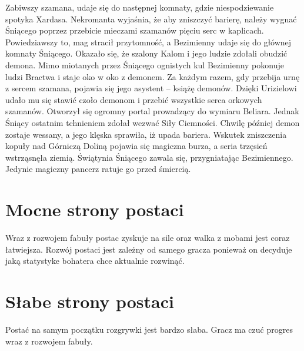\documentclass[11pt,polish, openany]{book}
\begin{document}
Zabiwszy szamana, udaje się do następnej komnaty, gdzie niespodziewanie spotyka Xardasa. Nekromanta wyjaśnia, że aby zniszczyć barierę, należy wygnać Śniącego poprzez przebicie mieczami szamanów pięciu serc w kaplicach. Powiedziawszy to, mag stracił przytomność, a Bezimienny udaje się do głównej komnaty Śniącego. Okazało się, że szalony Kalom i jego ludzie zdołali obudzić demona. Mimo miotanych przez Śniącego ognistych kul Bezimienny pokonuje ludzi Bractwa i staje oko w oko z demonem. Za każdym razem, gdy przebija urnę z sercem szamana, pojawia się jego asystent – książę demonów. Dzięki Urizielowi udało mu się stawić czoło demonom i przebić wszystkie serca orkowych szamanów. Otworzył się ogromny portal prowadzący do wymiaru Beliara. Jednak Śniący ostatnim tchnieniem zdołał wezwać Siły Ciemności. Chwilę później demon zostaje wessany, a jego klęska sprawiła, iż upada bariera. Wskutek zniszczenia kopuły nad Górniczą Doliną pojawia się magiczna burza, a seria trzęsień wstrząsnęła ziemią. Świątynia Śniącego zawala się, przygniatając Bezimiennego. Jedynie magiczny pancerz ratuje go przed śmiercią.
\newline
\section{Mocne strony postaci}
 Wraz z rozwojem fabuły postac zyskuje na sile oraz walka z mobami jest coraz łatwiejsza.
 Rozwój postaci jest zależny od samego gracza ponieważ on decyduje jaką statystyke bohatera chce aktualnie rozwinąć.
\section{Słabe strony postaci}
Postać na samym początku rozgrywki jest bardzo słaba.
Gracz ma czuć progres wraz z rozwojem fabuły.
\end{document}
